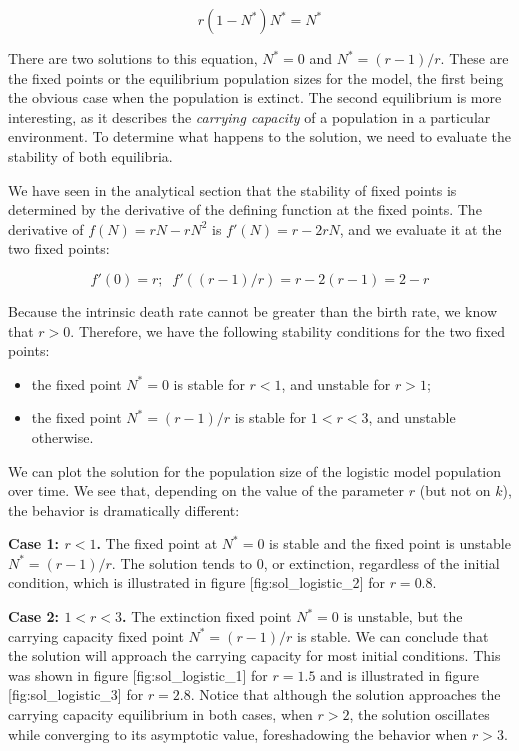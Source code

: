 \documentclass[
  letterpaper,
  DIV=11,
  numbers=noendperiod]{scrreprt}
\begin{document}
\[
r(1 - N^*) N^* = N^*
\]

There are two solutions to this equation, \(N^* = 0\) and
\(N^* = (r-1)/r\). These are the fixed points or the equilibrium
population sizes for the model, the first being the obvious case when
the population is extinct. The second equilibrium is more interesting,
as it describes the \emph{carrying capacity} of a population in a
particular environment. To determine what happens to the solution, we
need to evaluate the stability of both equilibria.

We have seen in the analytical section that the stability of fixed
points is determined by the derivative of the defining function at the
fixed points. The derivative of \(f(N) = rN-rN^2\) is \(f'(N) = r-2rN\),
and we evaluate it at the two fixed points:

\[
f'(0) = r; \; \; f'((r-1)/r) = r-2(r-1) = 2-r
\]

Because the intrinsic death rate cannot be greater than the birth rate,
we know that \(r>0\). Therefore, we have the following stability
conditions for the two fixed points:

\begin{itemize}
\item
  the fixed point \(N^*=0\) is stable for \(r<1\), and unstable for
  \(r>1\);
\item
  the fixed point \(N^*= (r-1)/r\) is stable for \(1<r<3\), and unstable
  otherwise.
\end{itemize}

We can plot the solution for the population size of the logistic model
population over time. We see that, depending on the value of the
parameter \(r\) (but not on \(k\)), the behavior is dramatically
different:

\textbf{Case 1: \(r < 1\).} The fixed point at \(N^*= 0\) is stable and
the fixed point is unstable \(N^* = (r-1)/r\). The solution tends to 0,
or extinction, regardless of the initial condition, which is illustrated
in figure {[}fig:sol\_logistic\_2{]} for \(r=0.8\).

\textbf{Case 2: \(1 < r < 3\).} The extinction fixed point \(N^*= 0\) is
unstable, but the carrying capacity fixed point \(N^* = (r-1)/r\) is
stable. We can conclude that the solution will approach the carrying
capacity for most initial conditions. This was shown in figure
{[}fig:sol\_logistic\_1{]} for \(r=1.5\) and is illustrated in figure
{[}fig:sol\_logistic\_3{]} for \(r=2.8\). Notice that although the
solution approaches the carrying capacity equilibrium in both cases,
when \(r>2\), the solution oscillates while converging to its asymptotic
value, foreshadowing the behavior when \(r>3\).
\end{document}
